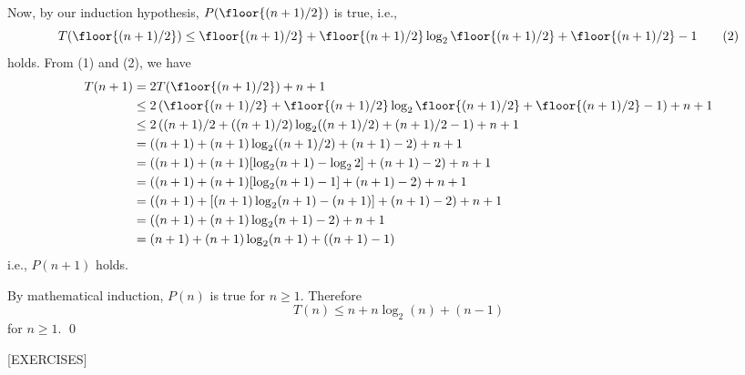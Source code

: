 Now, by our induction hypothesis,
$P(\floor{(n+1)/2})$ is true, i.e.,
\[
T(\floor{(n+1)/2}) 
\leq 
\floor{(n+1)/2}
+ \floor{(n+1)/2} \log_2 \floor{(n+1)/2} 
+ \floor{(n+1)/2} - 1 \tag{2}
\]
holds.
From (1) and (2), we have
\begin{align*}
T(n + 1) 
&= 2 T(\floor{(n+1)/2}) + n + 1 \\
&\leq 2 
   \left( 
\floor{(n+1)/2}
+ \floor{(n+1)/2} \log_2 \floor{(n+1)/2} 
+ \floor{(n+1)/2} - 1       
   \right)
   + n + 1 \\
&\leq 2 
   \left( 
   (n+1)/2
+ ((n+1)/2) \log_2 ((n+1)/2) 
+ (n+1)/2 - 1       
   \right)
   + n + 1 \\
&= \left( 
   (n+1)
+ (n+1) \log_2 ((n+1)/2) 
+ (n+1) - 2       
   \right)
   + n + 1 \\
&= \left( 
   (n+1)
+ (n+1) [\log_2 (n+1) - \log_2 2]
+ (n+1) - 2       
   \right)
   + n + 1 \\
&= \left( 
   (n+1)
+ (n+1) [\log_2 (n+1) - 1]
+ (n+1) - 2       
   \right)
   + n + 1 \\
&= \left( 
   (n+1)
+ [(n+1)\log_2 (n+1) - (n+1)]
+ (n+1) - 2       
   \right)
   + n + 1 \\
&= \left( 
   (n+1)
+ (n+1)\log_2 (n+1)
 - 2       
   \right)
   + n + 1 \\
&= (n+1)
+ (n+1)\log_2 (n+1)   
   + ((n + 1) - 1)
\end{align*}
i.e., $P(n+1)$ holds.

By mathematical induction, $P(n)$ is true for $n \geq 1$.
Therefore
\[
T(n) \leq n + n \log_2(n) + (n-1)
\]
for $n \geq 1$.
\qed

[EXERCISES]
